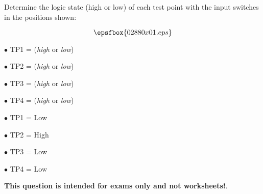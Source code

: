 

Determine the logic state (high or low) of each test point with the input switches in the positions shown:

$$\epsfbox{02880x01.eps}$$

\medskip
\item{$\bullet$} TP1 = ({\it high} or {\it low})
\item{$\bullet$} TP2 = ({\it high} or {\it low}) 
\item{$\bullet$} TP3 = ({\it high} or {\it low}) 
\item{$\bullet$} TP4 = ({\it high} or {\it low}) 
\medskip







\medskip
\item{$\bullet$} TP1 = Low
\item{$\bullet$} TP2 = High
\item{$\bullet$} TP3 = Low
\item{$\bullet$} TP4 = Low
\medskip







{\bf This question is intended for exams only and not worksheets!}.




